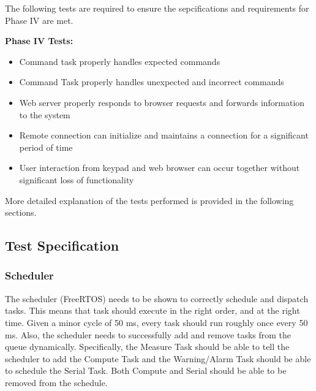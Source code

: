 \documentclass[12pt]{article} %
\begin{document}
		The following tests are required to ensure the sepcifications and
		requirements for Phase IV are met.

		\textbf{Phase IV Tests:}
		\begin{itemize}
			\item Command task properly handles expected commands
			\item Command Task properly handles unexpected and incorrect commands
			\item Web server properly responds to browser requests and forwards information to the system
			\item Remote connection can initialize and maintains a connection for a significant period of time
			\item User interaction from keypad and web browser can occur together without significant loss of functionality
		\end{itemize}
    More detailed explanation of the tests performed is provided in the
    following sections.
    
    \subsection{Test Specification} 

%

    \subsubsection{Scheduler}
    The scheduler (FreeRTOS) needs to be shown to correctly schedule and dispatch tasks.
    This means that task should execute in the right order, and at the right
    time. Given a minor cycle of 50 ms, every task should run roughly once
    every 50 ms.   Also, the scheduler needs to successfully add and remove
    tasks from the queue dynamically.  Specifically, the Measure Task
    should be able to tell the scheduler to add the Compute Task and the
    Warning/Alarm Task should be able to schedule the Serial Task.  Both
    Compute and Serial should be able to be removed from the schedule.
\end{document}
